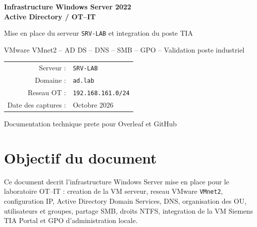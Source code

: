 \documentclass[11pt,a4paper]{article}
\begin{document}
\begin{titlepage}
    \centering
    \vspace*{3cm}

    {\Huge\bfseries
    Infrastructure Windows Server 2022\\[0.3cm]
    Active Directory / OT--IT
    \par}

    \vspace{1cm}

    {\Large
    Mise en place du serveur \texttt{SRV-LAB} et integration du poste TIA
    \par}

    \vspace{1.5cm}

    {\large
    VMware VMnet2 -- AD DS -- DNS -- SMB -- GPO -- Validation poste industriel
    \par}

    \vfill

    \begin{tabular}{rl}
        Serveur : & \texttt{SRV-LAB} \\
        Domaine : & \texttt{ad.lab} \\
        Reseau OT : & \texttt{192.168.161.0/24} \\
        Date des captures : & Octobre 2026 \\
    \end{tabular}

    \vspace{2cm}

    {\large Documentation technique prete pour Overleaf et GitHub}

\end{titlepage}

\tableofcontents
\newpage

\section{Objectif du document}

Ce document decrit l'infrastructure Windows Server mise en place pour
le laboratoire OT--IT : creation de la VM serveur, reseau VMware
\texttt{VMnet2}, configuration IP, Active Directory Domain Services,
DNS, organisation des OU, utilisateurs et groupes, partage SMB, droits
NTFS, integration de la VM Siemens TIA Portal et GPO d'administration
locale.
\end{document}
